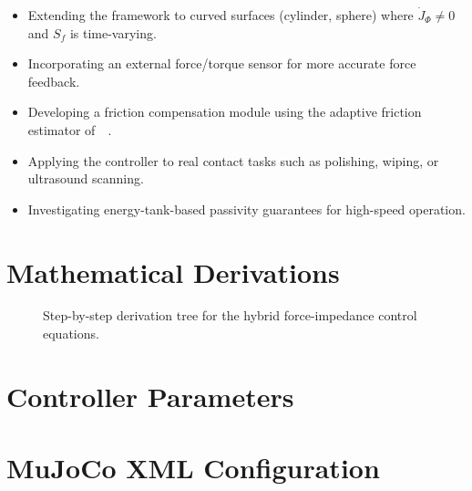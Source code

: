\documentclass[
	german,%
	accentcolor=9c,%
	ruledheaders=section,%
	class=report,%
	thesis={type=bachelor},%
	fontsize=11pt,%
	parskip=half-,%
	custommargins=true,%
	marginpar=false,%
]{tudapub}
\begin{document}
\begin{itemize}
    \item Extending the framework to curved surfaces (cylinder, sphere) where
          $\dot{J}_\Phi \neq 0$ and $S_f$ is time-varying.
    \item Incorporating an external force/torque sensor for more accurate
          force feedback.
    \item Developing a friction compensation module using the adaptive friction
          estimator of~\citeauthor{huang2025}~\cite{huang2025}.
    \item Applying the controller to real contact tasks such as polishing,
          wiping, or ultrasound scanning.
    \item Investigating energy-tank-based passivity guarantees for high-speed
          operation.
\end{itemize}


\appendix

\chapter{Mathematical Derivations}


\begin{figure}[htbp]
    \centering
    \caption{Step-by-step derivation tree for the hybrid force-impedance
             control equations.}
    \label{fig:derivation_tree}
\end{figure}


\chapter{Controller Parameters}



\chapter{MuJoCo XML Configuration}
\end{document}
